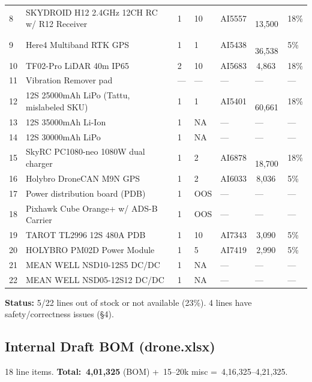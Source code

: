 \documentclass[11pt,a4paper]{article}
\newcommand{\Rs}{\rupee\,}
\begin{document}
\begin{xltabular}{\linewidth}{L{0.4cm}L{5.4cm}C{0.7cm}C{0.7cm}C{1.4cm}R{1.5cm}C{0.6cm}@{}}
8  & SKYDROID H12 2.4GHz 12CH RC w/ R12 Receiver              & 1 & 10 & AI5557 & \Rs{}13,500 & 18\% \\
9  & Here4 Multiband RTK GPS                                 & 1 & 1  & AI5438 & \Rs{}36,538 & 5\% \\
10 & TF02-Pro LiDAR 40m IP65                                 & 2 & 10 & AI5683 & \Rs{}4,863  & 18\% \\
11 & Vibration Remover pad                                   & ---&--- & ---    & ---         & --- \\
12 & 12S 25000mAh LiPo (Tattu, mislabeled SKU)                & 1 & 1  & AI5401 & \Rs{}60,661 & 18\% \\
13 & 12S 35000mAh Li-Ion                                      & 1 & NA  & ---    & ---         & --- \\
14 & 12S 30000mAh LiPo                                       & 1 & NA  & ---    & ---         & --- \\
15 & SkyRC PC1080-neo 1080W dual charger                      & 1 & 2  & AI6878 & \Rs{}18,700 & 18\% \\
16 & Holybro DroneCAN M9N GPS                                & 1 & 2  & AI6033 & \Rs{}8,036  & 5\% \\
17 & Power distribution board (PDB)                          & 1 & OOS & ---    & ---         & --- \\
18 & Pixhawk Cube Orange+ w/ ADS-B Carrier                    & 1 & OOS & ---    & ---         & --- \\
19 & TAROT TL2996 12S 480A PDB                               & 1 & 10 & AI7343 & \Rs{}3,090  & 5\% \\
20 & HOLYBRO PM02D Power Module                              & 1 & 5  & AI7419 & \Rs{}2,990  & 5\% \\
21 & MEAN WELL NSD10-12S5 DC/DC                              & 1 & NA  & ---    & ---         & --- \\
22 & MEAN WELL NSD05-12S12 DC/DC                             & 1 & NA  & ---    & ---         & --- \\
\bottomrule
\end{xltabular}

\noindent\textbf{Status:} 5/22 lines out of stock or not available (23\%). 4 lines have safety/correctness issues (§4).

\subsection{Internal Draft BOM (drone.xlsx)}
18 line items. \textbf{Total: \Rs{}4,01,325} (BOM) + \Rs{}15--20k misc = \Rs{}4,16,325--4,21,325.
\end{document}
